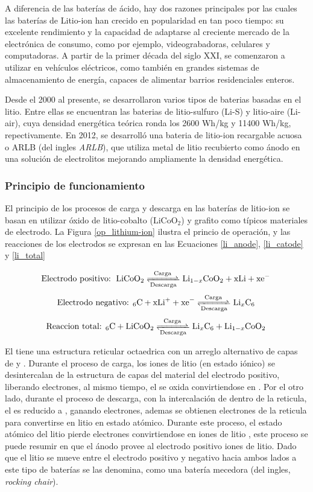 \documentclass[10pt,a4paper]{article}
\newcommand\reaction[1]{\begin{equation}\ce{#1}\end{equation}}
\begin{document}
    \noindent A diferencia de las baterías de ácido, hay dos razones principales por las 
    cuales las baterías de Litio-ion han crecido en popularidad en tan poco 
    tiempo: su excelente rendimiento y la capacidad de adaptarse al creciente 
    mercado de la electrónica de consumo, como por ejemplo, videograbadoras, 
    celulares y computadoras. A partir de la primer década del siglo XXI, se 
    comenzaron a utilizar en vehículos eléctricos, como también en grandes 
    sistemas de almacenamiento de energía, capaces de alimentar barrios 
    residenciales enteros.
    
    \noindent Desde el 2000 al presente, se desarrollaron varios
    tipos de baterias basadas en el litio. Entre ellas se encuentran las
    baterias de litio-sulfuro (Li-S) y litio-aire (Li-air), cuya densidad
    energética teórica ronda los 2600 Wh/kg y 11400 Wh/kg, repectivamente. En
    2012, se desarrolló una bateria de litio-ion recargable acuosa o \acrshort{ARLB} (del
    ingles \emph{\acrlong{ARLB}}), 
    que utiliza metal de litio recubierto como ánodo en una solución de 
    electrolitos mejorando ampliamente la densidad energética.

    \subsubsection{Principio de funcionamiento}

    El principio de los procesos de carga y descarga en las baterías de
    litio-ion se basan en utilizar óxido de litio-cobalto ($\mathrm{LiCoO_2}$)
    y grafito como típicos materiales de electrodo. La Figura
    \ref{op_lithium-ion} ilustra el princio de operación, y las reacciones de
    los electrodos se expresan en  las Ecuaciones \ref{li_anode}, 
    \ref{li_catode} y \ref{li_total}

    \reaction{\text{Electrodo positivo: } LiCoO2 <=>[Carga][Descarga] Li_{1-x}CoO2 + xLi + xe^- \label{li_anode}}
    \reaction{\text{Electrodo negativo: }6C + xLi^+ + xe^- <=>[Carga][Descarga] Li_{x}C6 \label{li_catode}}
    \reaction{\text{Reaccion total: }6C + LiCoO2 <=>[Carga][Descarga] Li_{x}C6 + Li_{1-x}CoO2 \label{li_total}}

    \noindent El  tiene una estructura reticular octaedrica con un arreglo
    alternativo de capas de  y . Durante el proceso de
    carga, los iones de litio (en estado iónico) se desintercalan de la
    estructura de capas del material del electrodo positivo, liberando electrones, 
    al mismo tiempo, el  se oxida convirtiendose en .
    Por el otro lado, durante el proceso de descarga, con la intercalación de  dentro de 
    la reticula, el  es reducido a , ganando 
    electrones, ademas se obtienen electrones de la reticula para 
    convertirse en litio en estado atómico. Durante este proceso, el estado 
    atómico del litio pierde electrones convirtiendose en iones de litio 
    , este proceso se puede resumir en que el ánodo provee al electrodo positivo 
    iones de litio. Dado que el litio se mueve entre el electrodo positivo y 
    negativo hacia ambos lados a este tipo de baterías se las denomina, como 
    una batería mecedora (del ingles, \emph{rocking chair}).
\end{document}
